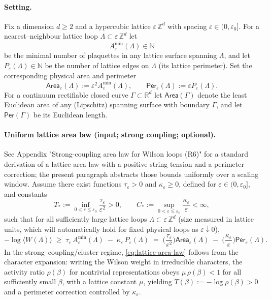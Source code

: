 \documentclass[11pt]{amsart}
\theoremstyle{plain}
\theoremstyle{definition}
\theoremstyle{remark}
\renewcommand{\tfrac}[2]{\textstyle\frac{#1}{#2}}
\begin{document}
\paragraph{Setting.}
Fix a dimension $d\ge 2$ and a hypercubic lattice $\varepsilon\,\mathbb{Z}^d$ with spacing $\varepsilon\in(0,\varepsilon_0]$. For a nearest--neighbour lattice loop $\Lambda\subset\varepsilon\,\mathbb{Z}^d$ let
\[
  A_\varepsilon^{\min}(\Lambda)\in\mathbb{N}
\]
be the minimal number of plaquettes in any lattice surface spanning $\Lambda$, and let $P_\varepsilon(\Lambda)\in\mathbb{N}$ be the number of lattice edges on $\Lambda$ (its lattice perimeter). Set the corresponding physical area and perimeter
\[
  \mathsf{Area}_\varepsilon(\Lambda):=\varepsilon^2 A_\varepsilon^{\min}(\Lambda),\qquad
  \mathsf{Per}_\varepsilon(\Lambda):=\varepsilon P_\varepsilon(\Lambda).
\]
For a continuum rectifiable closed curve $\Gamma\subset\mathbb{R}^d$ let $\mathsf{Area}(\Gamma)$ denote the least Euclidean area of any (Lipschitz) spanning surface with boundary $\Gamma$, and let $\mathsf{Per}(\Gamma)$ be its Euclidean length.

\paragraph{Uniform lattice area law (input; strong coupling; optional).}
See Appendix "Strong-coupling area law for Wilson loops (R6)" for a standard derivation of a lattice area law with a positive string tension and a perimeter correction; the present paragraph abstracts those bounds uniformly over a scaling window.
Assume there exist functions $\tau_\varepsilon>0$ and $\kappa_\varepsilon\ge 0$, defined for $\varepsilon\in (0,\varepsilon_0]$, and constants
\[
  T_*:=\inf_{0<\varepsilon\le\varepsilon_0}\frac{\tau_\varepsilon}{\varepsilon^2}>0,\qquad
  C_*:=\sup_{0<\varepsilon\le\varepsilon_0}\frac{\kappa_\varepsilon}{\varepsilon}<\infty,
\]
such that for all sufficiently large lattice loops $\Lambda\subset\varepsilon\,\mathbb{Z}^d$ (size measured in lattice units, which will automatically hold for fixed physical loops as $\varepsilon\downarrow 0$),
\begin{equation}
\label{eq:lattice-area-law}
  -\log\langle W(\Lambda)\rangle \;\ge\; \tau_\varepsilon\,A_\varepsilon^{\min}(\Lambda)\;-
  \;\kappa_\varepsilon\,P_\varepsilon(\Lambda)
  \;=\;\Big(\tfrac{\tau_\varepsilon}{\varepsilon^2}\Big)\mathsf{Area}_\varepsilon(\Lambda)\;-
  \;\Big(\tfrac{\kappa_\varepsilon}{\varepsilon}\Big)\mathsf{Per}_\varepsilon(\Lambda).
\end{equation}
In the strong--coupling/cluster regime, \eqref{eq:lattice-area-law} follows from the character expansion: writing the Wilson weight in irreducible characters, the activity ratio $\rho(\beta)$ for nontrivial representations obeys $\mu\,\rho(\beta) < 1$ for all sufficiently small $\beta$, with a lattice constant $\mu$, yielding $T(\beta):= -\log \rho(\beta) > 0$ and a perimeter correction controlled by $\kappa_\varepsilon$.
\end{document}
